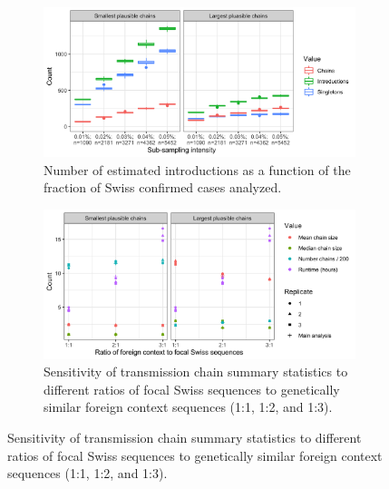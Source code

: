 \documentclass[9pt,twoside,lineno]{pnas-new}
\begin{document}
\begin{figure}[H]
\centering
\begin{subfigure}[b]{0.95\textwidth}
\centering
\includegraphics[width = 11.4cm]{figures/fig_SX_sensitivity_subsampling.png}
\caption{Number of estimated introductions as a function of the fraction of Swiss confirmed cases analyzed.}  
\end{subfigure}
\label{fig:sensitivity_downsampling}

\begin{subfigure}[b]{0.95\textwidth}
\centering
\includegraphics[width = 11.4cm]{figures/fig_SX_sensitivity_context_set_size.png}
\caption{Sensitivity of transmission chain summary statistics to different ratios of focal Swiss sequences to genetically similar foreign context sequences (1:1, 1:2, and 1:3).}  
\end{subfigure}
\label{fig:sensitivity_context_set_size}


\end{figure}
\end{document}
